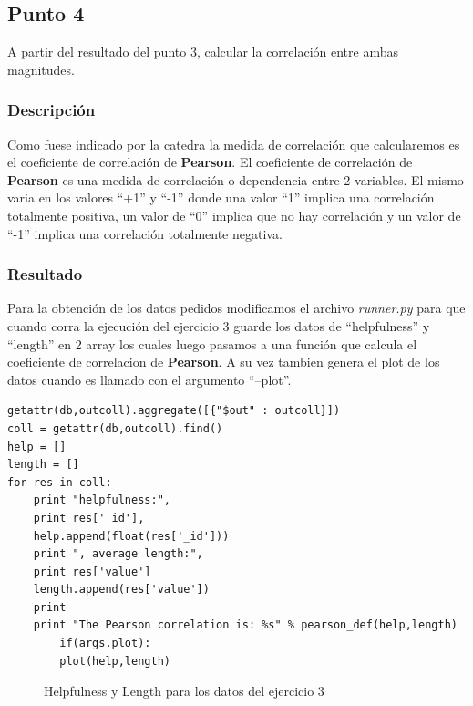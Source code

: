 \subsection{Punto 4}

A partir del resultado del punto 3, calcular la correlación entre ambas magnitudes.

\subsubsection{Descripción}

Como fuese indicado por la catedra la medida de correlación que calcularemos es el coeficiente de correlación de \textbf{Pearson}.
El coeficiente de correlación de \textbf{Pearson} es una medida de correlación o dependencia entre 2 variables. El mismo varia en los valores ``+1'' y ``-1'' donde una valor ``1'' implica una correlación totalmente positiva, un valor de ``0'' implica que no hay correlación y un valor de ``-1'' implica una correlación totalmente negativa.

\subsubsection{Resultado}

Para la obtención de los datos pedidos modificamos el archivo \textit{runner.py} para que cuando corra la ejecución del ejercicio 3 guarde los datos de ``helpfulness'' y ``length'' en 2 array los cuales luego pasamos a una función que calcula el coeficiente de correlacion de \textbf{Pearson}. A su vez tambien genera el plot de los datos cuando es llamado con el argumento ``--plot''.

\begin{lstlisting}[frame=leftline]
getattr(db,outcoll).aggregate([{"$out" : outcoll}])
coll = getattr(db,outcoll).find()
help = []
length = []
for res in coll:
	print "helpfulness:",
	print res['_id'],
	help.append(float(res['_id']))
	print ", average length:",
	print res['value'] 
	length.append(res['value'])
	print
	print "The Pearson correlation is: %s" % pearson_def(help,length)
		if(args.plot):
		plot(help,length)
\end{lstlisting}

\begin{figure}[H]
  \centering
  \caption{Helpfulness y Length para los datos del ejercicio 3}
  \label{fig41}
\end{figure}

